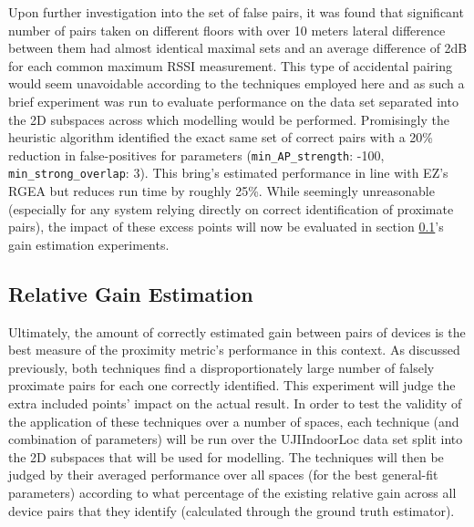 \documentclass{UoYCSproject}
\begin{document}
                Upon further investigation into the set of false pairs, it was found that significant number of pairs taken on different floors with over 10 meters lateral difference between them had almost identical maximal sets and an average difference of 2dB for each common maximum RSSI measurement. This type of accidental pairing would seem unavoidable according to the techniques employed here and as such a brief experiment was run to evaluate performance on the data set separated into the 2D subspaces across which modelling would be performed. Promisingly the heuristic algorithm identified the exact same set of correct pairs with a 20\% reduction in false-positives for parameters (\texttt{min\_AP\_strength}: -100, \texttt{min\_strong\_overlap}: 3). This bring's estimated performance in line with EZ's RGEA but reduces run time by roughly 25\%. While seemingly unreasonable (especially for any system relying directly on correct identification of proximate pairs), the impact of these excess points will now be evaluated in section \ref{sec:gainestimation}'s gain estimation experiments.
		    
		    \subsection{Relative Gain Estimation}
		    \label{sec:gainestimation}
            
                Ultimately, the amount of correctly estimated gain between pairs of devices is the best measure of the proximity metric's performance in this context. As discussed previously, both techniques find a disproportionately large number of falsely proximate pairs for each one correctly identified. This experiment will judge the extra included points' impact on the actual result. In order to test the validity of the application of these techniques over a number of spaces, each technique (and combination of parameters) will be run over the UJIIndoorLoc data set split into the 2D subspaces that will be used for modelling. The techniques will then be judged by their averaged performance over all spaces (for the best general-fit parameters) according to what percentage of the existing relative gain across all device pairs that they identify (calculated through the ground truth estimator).
                
\end{document}
